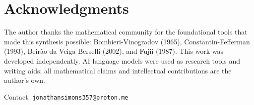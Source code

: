 \documentclass[11pt,reqno]{article}
\begin{document}
\section*{Acknowledgments}
The author thanks the mathematical community for the foundational tools
that made this synthesis possible: Bombieri-Vinogradov (1965),
Constantin-Fefferman (1993), Beirão da Veiga-Berselli (2002),
and Fujii (1987). This work was developed independently.
AI language models were used as research tools and writing aids;
all mathematical claims and intellectual contributions are the author's own.

Contact: \texttt{jonathansimons357@proton.me}
\end{document}
